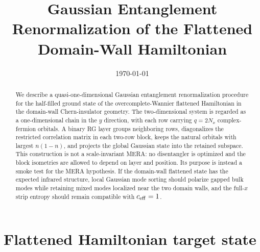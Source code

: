 \documentclass[aps,prb,twocolumn,floatfix]{revtex4-2}
\begin{document}
\title{Gaussian Entanglement Renormalization of the Flattened Domain-Wall Hamiltonian}

\date{\today}

\begin{abstract}
We describe a quasi-one-dimensional Gaussian entanglement renormalization
procedure for the half-filled ground state of the overcomplete-Wannier flattened
Hamiltonian in the domain-wall Chern-insulator geometry.  The two-dimensional
system is regarded as a one-dimensional chain in the \(y\) direction, with each
row carrying \(q=2N_x\) complex-fermion orbitals.  A binary RG layer groups
neighboring rows, diagonalizes the restricted correlation matrix in each
two-row block, keeps the natural orbitals with largest \(n(1-n)\), and projects
the global Gaussian state into the retained subspace.  This construction is
not a scale-invariant MERA: no disentangler is optimized and the block
isometries are allowed to depend on layer and position.  Its purpose is instead
a smoke test for the MERA hypothesis.  If the domain-wall flattened state has
the expected infrared structure, local Gaussian mode sorting should polarize
gapped bulk modes while retaining mixed modes localized near the two domain
walls, and the full-\(x\) strip entropy should remain compatible with
\(c_{\rm eff}=1\).
\end{abstract}

\maketitle

\section{Flattened Hamiltonian target state}
\end{document}
